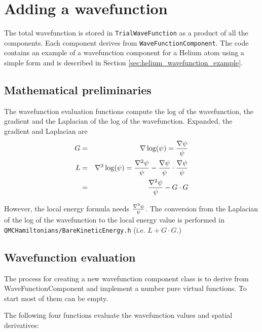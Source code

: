 \section{Adding a wavefunction}
\label{sec:adding_wavefunction}

The total wavefunction is stored in \texttt{TrialWaveFunction} as a product of all
the components.  Each component derives from \texttt{WaveFunctionComponent}.
The code contains an example of a wavefunction component for a Helium atom using a simple form and
is described in Section \ref{sec:helium_wavefunction_example}.


\subsection{Mathematical preliminaries}

The wavefunction evaluation functions compute the log of the wavefunction,
the gradient and the Laplacian of the log of the wavefunction.
Expanded, the gradient and Laplacian are
\begin{eqnarray}
G &=& \grad \log(\psi) = \frac{\grad \psi}{\psi} \\
L &=& \lap \log(\psi) = \frac{\lap \psi}{\psi} - \frac{\grad \psi}{\psi} \cdot \frac{\grad \psi}{\psi} \\
                &=& \frac{\lap \psi}{\psi} - G \cdot G
\end{eqnarray}

However, the local energy formula needs $\frac{\lap \psi}{\psi}$.  The conversion from the Laplacian of the log of the wavefunction to the local energy value is performed
in \texttt{QMCHamiltonians/BareKineticEnergy.h} (i.e. $L + G \cdot G$.)


\subsection{Wavefunction evaluation}

The process for creating a new wavefunction component class is to derive
from WaveFunctionComponent and implement a number pure virtual functions.
To start most of them can be empty.

The following four functions evaluate the wavefunction values and spatial derivatives:

